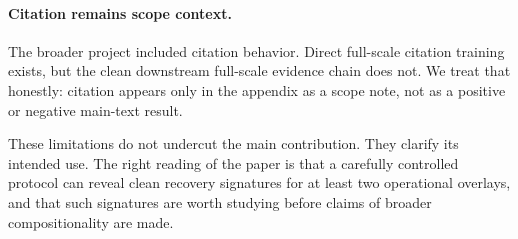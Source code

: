 \paragraph{Citation remains scope context.}
The broader project included citation behavior. Direct full-scale citation training exists, but the clean downstream full-scale evidence chain does not. We treat that honestly: citation appears only in the appendix as a scope note, not as a positive or negative main-text result.

These limitations do not undercut the main contribution. They clarify its intended use. The right reading of the paper is that a carefully controlled protocol can reveal clean recovery signatures for at least two operational overlays, and that such signatures are worth studying before claims of broader compositionality are made.
